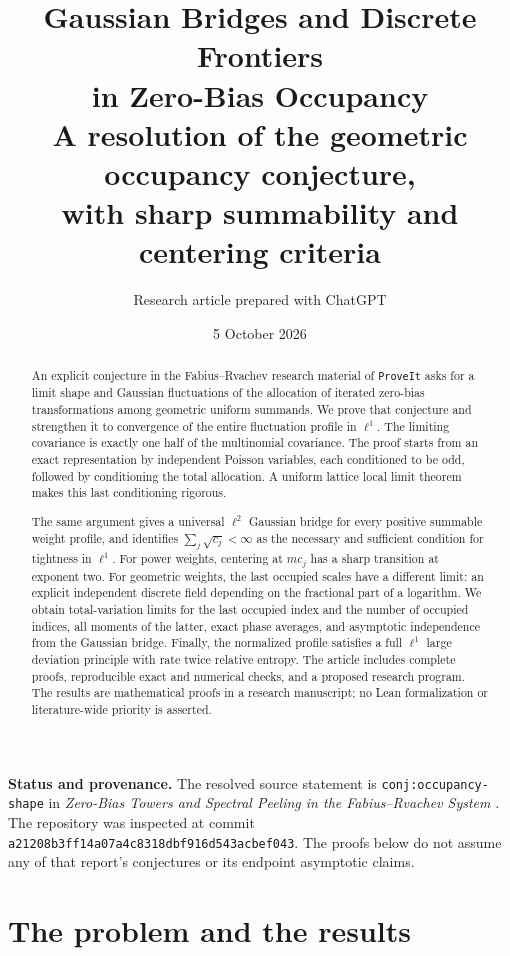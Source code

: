 \documentclass[11pt,a4paper]{article}
\title{\textbf{Gaussian Bridges and Discrete Frontiers\\in Zero-Bias Occupancy}\\[0.6em]
\large A resolution of the geometric occupancy conjecture,\\
with sharp summability and centering criteria}
\author{Research article prepared with ChatGPT}
\date{5 October 2026}
\numberwithin{equation}{section}
\theoremstyle{definition}
\theoremstyle{remark}
\begin{document}
\maketitle
\begin{abstract}
An explicit conjecture in the Fabius--Rvachev research material of
\texttt{ProveIt} asks for a limit shape and Gaussian fluctuations of the
allocation of iterated zero-bias transformations among geometric uniform
summands. We prove that conjecture and strengthen it to convergence of the
entire fluctuation profile in $\ell^1$. The limiting covariance is exactly
one half of the multinomial covariance. The proof starts from an exact
representation by independent Poisson variables, each conditioned to be odd,
followed by conditioning the total allocation. A uniform lattice local limit
theorem makes this last conditioning rigorous.

The same argument gives a universal $\ell^2$ Gaussian bridge for every
positive summable weight profile, and identifies $\sum_j\sqrt{c_j}<\infty$
as the necessary and sufficient condition for tightness in $\ell^1$.
For power weights, centering at $mc_j$ has a sharp transition at exponent
two. For geometric weights, the last occupied scales have a different
limit: an explicit independent discrete field depending on the fractional
part of a logarithm. We obtain total-variation limits for the last occupied
index and the number of occupied indices, all moments of the latter, exact
phase averages, and asymptotic independence from the Gaussian bridge.
Finally, the normalized profile satisfies a full $\ell^1$ large deviation
principle with rate twice relative entropy. The article includes complete
proofs, reproducible exact and numerical checks, and a proposed research
program. The results are mathematical proofs in a research manuscript;
no Lean formalization or literature-wide priority is asserted.
\end{abstract}

\vspace{0.5em}
\noindent\textbf{Status and provenance.}
The resolved source statement is \texttt{conj:occupancy-shape} in
\emph{Zero-Bias Towers and Spectral Peeling in the Fabius--Rvachev System}
\cite{repo-report}. The repository was inspected at commit
\texttt{a21208b3ff14a07a4c8318dbf916d543acbef043}.
The proofs below do not assume any of that report's conjectures or its
endpoint asymptotic claims.

\newpage
{\small\tableofcontents}
\newpage

\section{The problem and the results}
\label{sec:intro}
\end{document}
